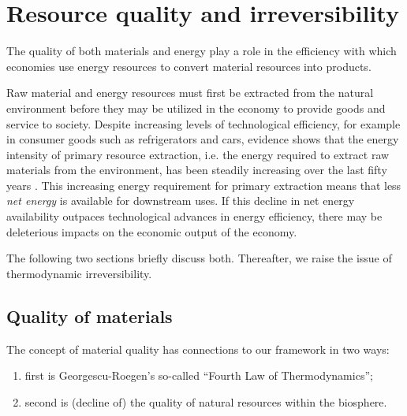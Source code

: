 \section{Resource quality and irreversibility}
\label{sec:resource_quality_and_irreversibility}

The quality of both materials 
and energy play a role in the 
efficiency with which economies use energy resources to convert material resources into products.

Raw material and energy resources must first 
be extracted from the natural environment 
before they may be utilized in the economy 
to provide goods and service to society. 
Despite increasing levels of technological efficiency, 
for example in consumer goods such as refrigerators and cars, 
evidence shows that 
the energy intensity of primary resource extraction, 
i.e. the energy required to extract raw materials 
from the environment, 
has been steadily increasing over 
the last fifty years \cite{Hall1986, Mudd2010, Brandt2011}. 
This increasing energy requirement for 
primary extraction means that 
less \textit{net energy} is available 
for downstream uses. 
If this decline in net energy availability 
outpaces technological advances in energy efficiency, 
there may be deleterious impacts on the 
economic output of the economy.

The following two sections briefly discuss both.
Thereafter, we raise the issue of thermodynamic irreversibility.

\subsection{Quality of materials}
\label{sec:material_quality}


The concept of material quality has connections to our framework in two ways:
\begin{enumerate}
	\item 
		first is Georgescu-Roegen's so-called 
		``Fourth Law of Thermodynamics'';
	\item		
		second is (decline of) the quality of 
		natural resources	within the biosphere.
\end{enumerate}

